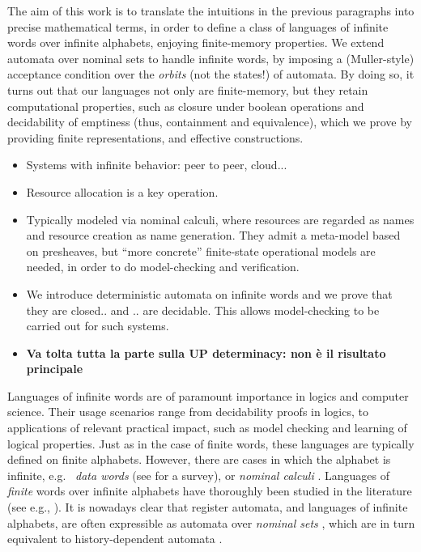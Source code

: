 The aim of this work is to translate the intuitions in the previous paragraphs into precise mathematical terms, in order to define a class of languages of infinite words over infinite alphabets, enjoying finite-memory properties. We extend automata over nominal sets to handle infinite words, by imposing a (Muller-style) acceptance condition 
over the \emph{orbits} (not the states!) of automata. By doing so, it turns out that our languages not only are finite-memory, but they retain computational properties, such as closure under boolean operations and decidability of emptiness (thus, containment and equivalence), which we prove by providing finite representations, and effective constructions. 

\begin{itemize}
	\item Systems with infinite behavior: peer to peer, cloud...
	\item Resource allocation is a key operation. 
	\item Typically modeled via nominal calculi, where resources are regarded as names and resource creation as name generation. They admit a meta-model based on presheaves, but ``more concrete'' finite-state operational models are needed, in order to do model-checking and verification.
	\item We introduce deterministic automata on infinite words and we prove that they are closed.. and .. are decidable. This allows model-checking to be carried out for such systems.
	\item {\bf Va tolta tutta la parte sulla UP determinacy: non è il risultato principale}
\end{itemize}

Languages of infinite words are of paramount importance in logics and computer science. Their usage scenarios range from decidability proofs in logics, 
 to applications of relevant practical impact, such as model checking and learning of logical properties. Just as in the case of finite words, these languages are typically defined on finite alphabets. However, there are cases in which the alphabet is infinite, e.g.\
\emph{data words} (see \cite{Seg06} for  a survey), or \emph{nominal calculi} \cite{MPW92}. Languages of \emph{finite} words over infinite alphabets have thoroughly been studied in the literature (see e.g., \cite{KF94,Tze11}). 
It is nowadays clear that register automata, and languages of infinite alphabets, are often expressible as automata over \emph{nominal sets} \cite{GP02}, which are in turn equivalent  to history-dependent automata \cite{Pistore99,FioreS06,GadducciMM06}. 

